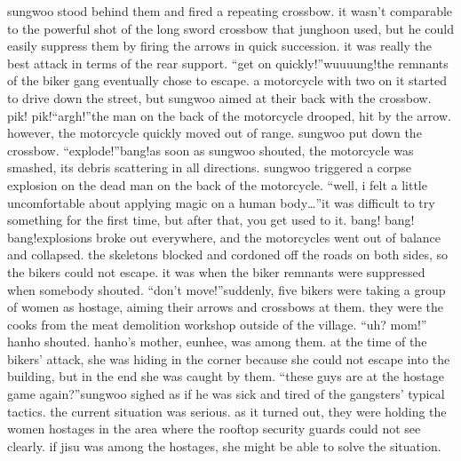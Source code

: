 sungwoo stood behind them and fired a repeating crossbow.
 it wasn’t comparable to the powerful shot of the long sword crossbow that junghoon used, but he could easily suppress them by firing the arrows in quick succession.
 it was really the best attack in terms of the rear support.
“get on quickly!”wuuuung!the remnants of the biker gang eventually chose to escape.
 a motorcycle with two on it started to drive down the street, but sungwoo aimed at their back with the crossbow.
pik! pik!“argh!”the man on the back of the motorcycle drooped, hit by the arrow.
 however, the motorcycle quickly moved out of range.
sungwoo put down the crossbow.
“explode!”bang!as soon as sungwoo shouted, the motorcycle was smashed, its debris scattering in all directions.
 sungwoo triggered a corpse explosion on the dead man on the back of the motorcycle.
“well, i felt a little uncomfortable about applying magic on a human body…”it was difficult to try something for the first time, but after that, you get used to it.
bang! bang! bang!explosions broke out everywhere, and the motorcycles went out of balance and collapsed.
the skeletons blocked and cordoned off the roads on both sides, so the bikers could not escape.
it was when the biker remnants were suppressed when somebody shouted.
“don’t move!”suddenly, five bikers were taking a group of women as hostage, aiming their arrows and crossbows at them.
 they were the cooks from the meat demolition workshop outside of the village.
“uh? mom!” hanho shouted.
hanho’s mother, eunhee, was among them.
 at the time of the bikers’ attack, she was hiding in the corner because she could not escape into the building, but in the end she was caught by them.
“these guys are at the hostage game again?”sungwoo sighed as if he was sick and tired of the gangsters’ typical tactics.
 the current situation was serious.
 as it turned out, they were holding the women hostages in the area where the rooftop security guards could not see clearly.
 if jisu was among the hostages, she might be able to solve the situation.


 
